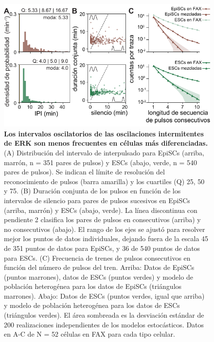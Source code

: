 \documentclass[./main.tex]{subfiles}
\begin{document}
\begin{figure}
    \centering
    \includegraphics[width=1\columnwidth]{figures/chapter3/C3_EpiSC_consecutive.pdf} \caption{\textbf{Los intervalos oscilatorios de las oscilaciones intermitentes de ERK son menos frecuentes en células más diferenciadas.} (A) Distribución del intervalo de interpulsado para EpiSCs (arriba, marrón, n = 351 pares de pulsos) y ESCs (abajo, verde, n = 540 pares de pulsos). Se indican el límite de resolución del reconocimiento de pulsos (barra amarilla) y los cuartiles (Q) 25, 50 y 75. (B) Duración conjunta de los pulsos en función de los intervalos de silencio para pares de pulsos sucesivos en EpiSCs (arriba, marrón) y ESCs (abajo, verde). La línea discontinua con pendiente 2 clasifica los pares de pulsos en consecutivos (arriba) y no consecutivos (abajo). El rango de los ejes se ajustó para resolver mejor los puntos de datos individuales, dejando fuera de la escala 45 de 351 puntos de datos para EpiSCs, y 36 de 540 puntos de datos para ESCs. (C) Frecuencia de trenes de pulsos consecutivos en función del número de pulsos del tren. Arriba: Datos de EpiSCs (puntos marrones), datos de ESCs (puntos verdes) y modelo de población heterogénea para los datos de EpiSCs (triángulos marrones). Abajo: Datos de ESCs (puntos verdes, igual que arriba) y modelo de población heterogénea para los datos de ESCs (triángulos verdes). El área sombreada es la desviación estándar de 200 realizaciones independientes de los modelos estocásticos. Datos en A-C de N = 52 células en FAX para cada tipo celular.}
    \label{C3_fig:EPI_consecutive}
\end{figure}
\end{document}
